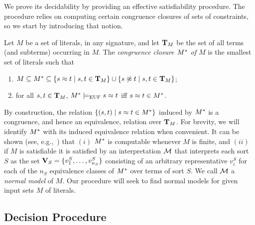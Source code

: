 \documentclass{svjour3}                     %
\begin{document}
We prove its decidability by providing an effective satisfiability procedure.
The procedure relies on computing certain congruence closures of sets of constraints,
so we start by introducing that notion.

\begin{definition}
Let $M$ be a set of literals, in any signature, and 
let $\terms_M$ be the set of all terms (and subterms) occurring in $M$.
The \emph{congruence closure $\cc M$ of $M$} is 
the smallest set of literals such that
\begin{enumerate}
\item $M \subseteq \cc M 
         \subseteq \{s \teq t \mid s,t \in \terms_M\} \cup \{s \tneq t \mid s,t \in \terms_M\}$;
\item for all $s,t \in \terms_M$, $\cc M \ent[\euf] s \teq t$ iff $s \teq t \in \cc M$. 
\end{enumerate}
\end{definition}

By construction, the relation $\{(s,t) \mid s \teq t \in \cc M\}$ induced by $\cc M$ is 
a congruence, and hence an equivalence, relation over $\terms_M$.
For brevity, we will identify $\cc M$ with its induced equivalence relation when convenient.
It can be shown (see, e.g.,~\cite{BaaNip-98}) that 
$(i)$ $\cc M$ is computable whenever $M$ is finite, 
and 
$(ii)$ if $M$ is satisfiable
it is satisfied by an interpretation $\M$ that interprets each sort $S$
as the set $\vals_S = \{v^S_1, \ldots, v^S_{n_S}\}$ consisting of
an arbitrary representative $v^S_i$ for each of the $n_S$ equivalence classes 
of $\cc M$ over terms of sort $S$.  
We call $\M$ a \emph{normal model} of $M$.
Our procedure will seek to find normal models for given input sets $M$ of literals.



\subsection{Decision Procedure} 
\label{sec:fcc-basic}
\end{document}
